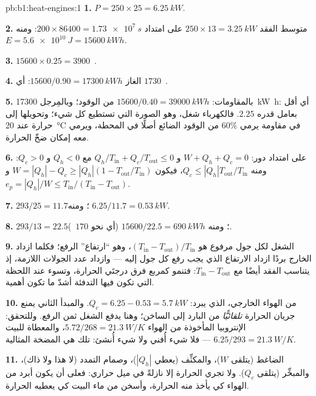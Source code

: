 \begin{solution}{pb:b1:heat-engines:1}
\textbf{1.} $P = 250 \times 25 = \qty{6.25}{kW}$.

\textbf{2.} متوسط الفقد $250 \times 13 = \qty{3.25}{kW}$ على امتداد $200 \times 86400 =
\qty{1.73e7}{s}$: ومنه $E = \qty{5.6e10}{J} = \qty{15600}{kW h}$.

\textbf{3.} $15600 \times 0.25 = 3900$~\texteuro.

\textbf{4.} الغاز $15600/0.90 = \qty{17300}{kW h}$: أي $1730$~\texteuro.

\textbf{5.} بالمقاومات: $15600/0.40 = \qty{39000}{kW h}$ من الوقود؛ وبالمِرجل
\qty{17300}{kW h}: أي أقل بعامل قدره $2.25$. فالكهرباء شغل، وهو الصورة التي
تستطيع كل شيء؛ وتحويلها إلى حرارة عند \qty{20}{\degreeCelsius} في مقاومة
يرمي $60\%$ من الوقود الضائع أصلًا في المحطة، ويرمي معه
إمكان ضخّ الحرارة.

\textbf{6.} على امتداد دور: $W + Q_h + Q_c = 0$ و $Q_h/T_{\mathrm{in}} +
Q_c/T_{\mathrm{out}} \leq 0$ مع $Q_h < 0$ و $Q_c > 0$: ومنه $Q_c \leq
|Q_h|T_{\mathrm{out}}/T_{\mathrm{in}}$، فيكون $W = |Q_h| - Q_c \geq |Q_h|(1 -
T_{\mathrm{out}}/T_{\mathrm{in}})$ و $e_p = |Q_h|/W \leq T_{\mathrm{in}}/(T_{\mathrm{in}} -
T_{\mathrm{out}})$.

\textbf{7.} $293/25 = 11.7$؛ ومنه $6.25/11.7 = \qty{0.53}{kW}$.

\textbf{8.} $293/13 = 22.5$؛ ومنه $15600/22.5 = \qty{690}{kW h}$ (أي نحو
$170$~\texteuro).

\textbf{9.} الشغل لكل جول مرفوع هو $(T_{\mathrm{in}} - T_{\mathrm{out}})/
T_{\mathrm{in}}$، وهو ``ارتفاع'' الرفع؛ فكلما ازداد الخارج بردًا
ازداد الارتفاع الذي يجب رفع كل جول إليه --- وازداد عدد الجولات اللازمة، إذ
يتناسب الفقد أيضًا مع $T_{\mathrm{in}} - T_{\mathrm{out}}$: فتنمو
 كمربع فرق درجتَي الحرارة، وتسوء
عند اللحظة التي تكون فيها التدفئة أشدّ ما تكون أهمية.

\textbf{10.} من الهواء الخارجي، الذي يبرد: $Q_c = 6.25 - 0.53 =
\qty{5.7}{kW}$. والمبدأ الثاني يمنع جريان الحرارة \emph{تلقائيًّا}
من البارد إلى الساخن؛ وهنا يدفع الشغل ثمن الرفع. وللتحقق: الإنتروبيا المأخوذة من
الهواء $5.72/268 = \qty{21.3}{W/K}$، والمعطاة للبيت $6.25/293 =
\qty{21.3}{W/K}$ --- فلا شيء أُفني ولا شيء أُنشئ: تلك هي المضخة المثالية.

\textbf{11.} الضاغط (يتلقى $W$)، والمكثِّف (يعطي $|Q_h|$)،
وصمام التمدد (لا هذا ولا ذاك)، والمبخِّر (يتلقى $Q_c$). ولا تجري الحرارة إلا
نازلةً في ميل حراري: فعلى  أن يكون أبرد من الهواء كي
يأخذ منه الحرارة، وأسخن من ماء البيت كي يعطيه الحرارة.


\end{solution}
